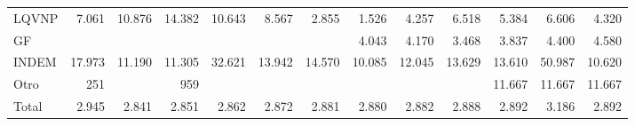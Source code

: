 \begin{tabular}{lllllllllllll}
\multicolumn{1}{l}{\hspace{1em}LQVNP} &
  \multicolumn{1}{|r}{7.061} &
  \multicolumn{1}{r}{10.876} &
  \multicolumn{1}{r}{14.382} &
  \multicolumn{1}{r}{10.643} &
  \multicolumn{1}{r}{8.567} &
  \multicolumn{1}{r}{2.855} &
  \multicolumn{1}{r}{1.526} &
  \multicolumn{1}{r}{4.257} &
  \multicolumn{1}{r}{6.518} &
  \multicolumn{1}{r}{5.384} &
  \multicolumn{1}{r}{6.606} &
  \multicolumn{1}{r}{4.320} \\
\multicolumn{1}{l}{\hspace{1em}GF} &
  \multicolumn{1}{|r}{} &
  \multicolumn{1}{r}{} &
  \multicolumn{1}{r}{} &
  \multicolumn{1}{r}{} &
  \multicolumn{1}{r}{} &
  \multicolumn{1}{r}{} &
  \multicolumn{1}{r}{4.043} &
  \multicolumn{1}{r}{4.170} &
  \multicolumn{1}{r}{3.468} &
  \multicolumn{1}{r}{3.837} &
  \multicolumn{1}{r}{4.400} &
  \multicolumn{1}{r}{4.580} \\
\multicolumn{1}{l}{\hspace{1em}INDEM} &
  \multicolumn{1}{|r}{17.973} &
  \multicolumn{1}{r}{11.190} &
  \multicolumn{1}{r}{11.305} &
  \multicolumn{1}{r}{32.621} &
  \multicolumn{1}{r}{13.942} &
  \multicolumn{1}{r}{14.570} &
  \multicolumn{1}{r}{10.085} &
  \multicolumn{1}{r}{12.045} &
  \multicolumn{1}{r}{13.629} &
  \multicolumn{1}{r}{13.610} &
  \multicolumn{1}{r}{50.987} &
  \multicolumn{1}{r}{10.620} \\
\multicolumn{1}{l}{\hspace{1em}Otro} &
  \multicolumn{1}{|r}{251} &
  \multicolumn{1}{r}{} &
  \multicolumn{1}{r}{959} &
  \multicolumn{1}{r}{} &
  \multicolumn{1}{r}{} &
  \multicolumn{1}{r}{} &
  \multicolumn{1}{r}{} &
  \multicolumn{1}{r}{} &
  \multicolumn{1}{r}{} &
  \multicolumn{1}{r}{11.667} &
  \multicolumn{1}{r}{11.667} &
  \multicolumn{1}{r}{11.667} \\
\multicolumn{1}{l}{\hspace{1em}Total} &
  \multicolumn{1}{|r}{2.945} &
  \multicolumn{1}{r}{2.841} &
  \multicolumn{1}{r}{2.851} &
  \multicolumn{1}{r}{2.862} &
  \multicolumn{1}{r}{2.872} &
  \multicolumn{1}{r}{2.881} &
  \multicolumn{1}{r}{2.880} &
  \multicolumn{1}{r}{2.882} &
  \multicolumn{1}{r}{2.888} &
  \multicolumn{1}{r}{2.892} &
  \multicolumn{1}{r}{3.186} &
  \multicolumn{1}{r}{2.892} \\
\cline{1-13}
\end{tabular}
